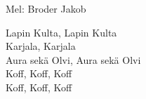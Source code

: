 \begin{SongText}
    \begin{SongInfo}
        Mel: Broder Jakob
    \end{SongInfo}
    \begin{SongVerse}
        Lapin Kulta, Lapin Kulta\\%
        Karjala, Karjala\\%
        Aura sekä Olvi, Aura sekä Olvi\\%
        Koff, Koff, Koff\\%
        Koff, Koff, Koff
    \end{SongVerse}
\end{SongText}
